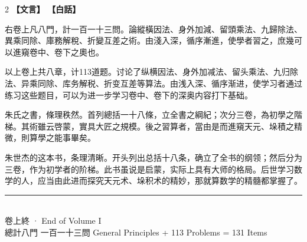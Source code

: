 \documentclass[11pt,a4paper]{article}
\begin{document}
\begin{paracol}{2}
\noindent\textbf{\textcolor{leftlabel}{【文言】}}
\switchcolumn
\noindent\textbf{\textcolor{rightlabel}{【白話】}}
\switchcolumn*

右卷上凡八門，計一百一十三問。論縱橫因法、身外加減、留頭乘法、九歸除法、異乘同除、庫務解稅、折變互差之術。由淺入深，循序漸進，使學者習之，庶幾可以進窺卷中、卷下之奧也。

\switchcolumn

以上卷上共八章，计113道题。讨论了纵横因法、身外加减法、留头乘法、九归除法、异乘同除、库务解税、折变互差等算法。由浅入深、循序渐进，使学习者通过练习这些题目，可以为进一步学习卷中、卷下的深奥内容打下基础。

\switchcolumn*

朱氏之書，條理秩然。首列總括一十八條，立全書之綱紀；次分三卷，為初學之階梯。其術雖云啓蒙，實具大匠之規模。後之習算者，當由是而進窺天元、垛積之精微，則算學之能事畢矣。

\switchcolumn

朱世杰的这本书，条理清晰。开头列出总括十八条，确立了全书的纲领；然后分为三卷，作为初学者的阶梯。此书虽说是启蒙，实际上具有大师的格局。后世学习数学的人，应当由此进而探究天元术、垛积术的精妙，那就算数学的精髓都掌握了。

\end{paracol}

\vspace{2cm}
\begin{center}
\textcolor{sectioncolor}{\rule{0.3\textwidth}{0.4pt}}\\[0.5cm]
{\small\color{notecolor} 卷上終 · End of Volume I\\
總計八門 \quad 一百一十三問  General Principles + 113 Problems = 131 Items}
\end{center}
\end{document}
